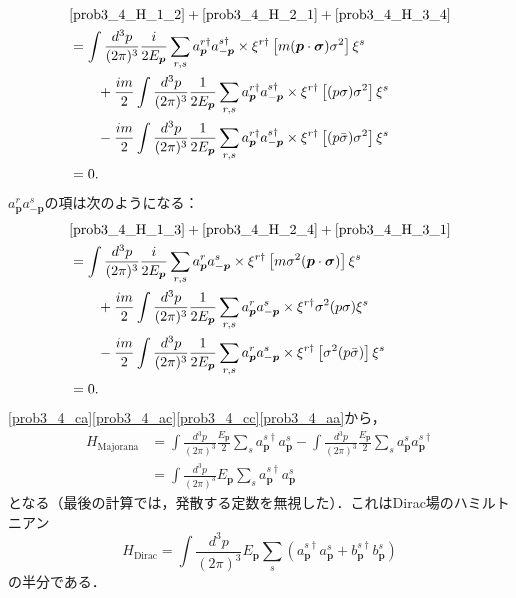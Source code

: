 \begin{align}
  & \eqref{prob3_4_H_1_2} + \eqref{prob3_4_H_2_1} + \eqref{prob3_4_H_3_4} \notag \\
  & = \int \frac{d^3p}{(2\pi)^3} \frac{i}{2E_{\boldsymbol{p}}}
  \sum_{r, s} a_{\boldsymbol{p}}^{r\dagger} a_{-\boldsymbol{p}}^{s\dagger} \times \xi^{r\dagger} \left[ m (\boldsymbol{p} \cdot \boldsymbol{\sigma}) \sigma^2 \right] \xi^s \notag \\
  & \qquad + \frac{im}{2} \int \frac{d^3p}{(2\pi)^3} \frac{1}{2E_{\boldsymbol{p}}} \sum_{r, s} a_{\boldsymbol{p}}^{r\dagger} a_{-\boldsymbol{p}}^{s\dagger} \times \xi^{r\dagger} \left[ (p \sigma)\sigma^2 \right] \xi^s \notag \\
  & \qquad - \frac{im}{2}\int \frac{d^3p}{(2\pi)^3} \frac{1}{2E_{\boldsymbol{p}}} \sum_{r, s} a_{\boldsymbol{p}}^{r\dagger} a_{-\boldsymbol{p}}^{s\dagger} \times \xi^{r\dagger} \left[ (p\bar\sigma) \sigma^2 \right] \xi^s \notag \\
  & = 0 . \label{prob3_4_cc}
\end{align}
$a_{\boldsymbol{p}}^{r} a_{-\boldsymbol{p}}^{s}$の項は次のようになる：
\begin{align}
  & \eqref{prob3_4_H_1_3} + \eqref{prob3_4_H_2_4} + \eqref{prob3_4_H_3_1} \notag \\
  & = \int \frac{d^3p}{(2\pi)^3} \frac{i}{2E_{\boldsymbol{p}}} \sum_{r, s} a_{\boldsymbol{p}}^{r} a_{-\boldsymbol{p}}^s \times \xi^{r\dagger} \left [ m \sigma^2 (\boldsymbol{p} \cdot \boldsymbol{\sigma}) \right ] \xi^s \notag \\
  & \qquad + \frac{im}{2} \int \frac{d^3p}{(2\pi)^3} \frac{1}{2E_{\boldsymbol{p}}} \sum_{r, s} a_{\boldsymbol{p}}^{r} a_{-\boldsymbol{p}}^{s} \times \xi^{r\dagger} \sigma^2 (p \sigma) \xi^s \notag \\
  & \qquad - \frac{im}{2}\int \frac{d^3p}{(2\pi)^3} \frac{1}{2E_{\boldsymbol{p}}} \sum_{r, s} a_{\boldsymbol{p}}^{r} a_{-\boldsymbol{p}}^s \times \xi^{r\dagger} \left[ \sigma^2 (p\bar\sigma) \right] \xi^s \notag \\
  & = 0 . \label{prob3_4_aa}
\end{align}
\eqref{prob3_4_ca}\eqref{prob3_4_ac}\eqref{prob3_4_cc}\eqref{prob3_4_aa}から，
\begin{align*}
  H_\text{Majorana} & = \int \frac{d^3p}{(2\pi)^3} \frac{E_{\boldsymbol{p}}}{2} \sum_{s} a_{\boldsymbol{p}}^{s\dagger} a_{\boldsymbol{p}}^s - \int \frac{d^3p}{(2\pi)^3} \frac{E_{\boldsymbol{p}}}{2} \sum_{s} a_{\boldsymbol{p}}^{s} a_{\boldsymbol{p}}^{s\dagger} \\
  & = \int \frac{d^3p}{(2\pi)^3} E_{\boldsymbol{p}} \sum_{s} a_{\boldsymbol{p}}^{s\dagger} a_{\boldsymbol{p}}^s
\end{align*}
となる（最後の計算では，発散する定数を無視した）．これはDirac場のハミルトニアン
\[ H_\text{Dirac} = \int \frac{d^3p}{(2\pi)^3} E_{\boldsymbol{p}} \sum_{s} \left( a_{\boldsymbol{p}}^{s\dagger} a_{\boldsymbol{p}}^s + b_{\boldsymbol{p}}^{s\dagger} b_{\boldsymbol{p}}^s \right) \]
の半分である．

